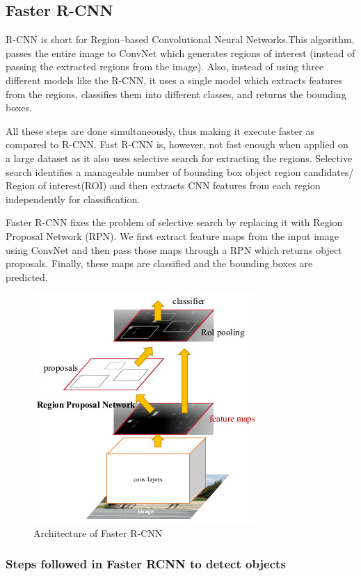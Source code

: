 \documentclass[12pt]{report}
\begin{document}
\subsection{Faster R-CNN}
R-CNN is short for Region--based Convolutional Neural Networks.This algorithm, passes the entire image to ConvNet which generates regions of interest (instead of passing the extracted regions from the image). 
Also, instead of using three different models like the  R-CNN, it uses a single model which extracts features from the regions, classifies them into different classes, and returns the bounding boxes\cite{CNN}.

All these steps are done simultaneously, thus making it execute faster as compared to R-CNN. Fast R-CNN is, however, not fast enough when applied on a large dataset as it also uses selective search for extracting the regions. Selective search identifies a manageable number of bounding box object region candidates/ Region of interest(ROI) and then extracts CNN features from each region independently for classification.

Faster R-CNN fixes the problem of selective search by replacing it with Region Proposal Network (RPN). We first extract feature maps from the input image using ConvNet and then pass those maps through a RPN which returns object proposals. Finally, these maps are classified and the bounding boxes are predicted\cite{CNN}.

\begin{figure}[H]\includegraphics[scale=0.9]{faster-r-cnn-model.jpg}\centering\caption{Architecture of Faster R-CNN\cite{CNN}} \label{fig:Architecture of Faster  RCNN} \end{figure}

\subsubsection{Steps followed in  Faster RCNN to detect objects}
\end{document}
